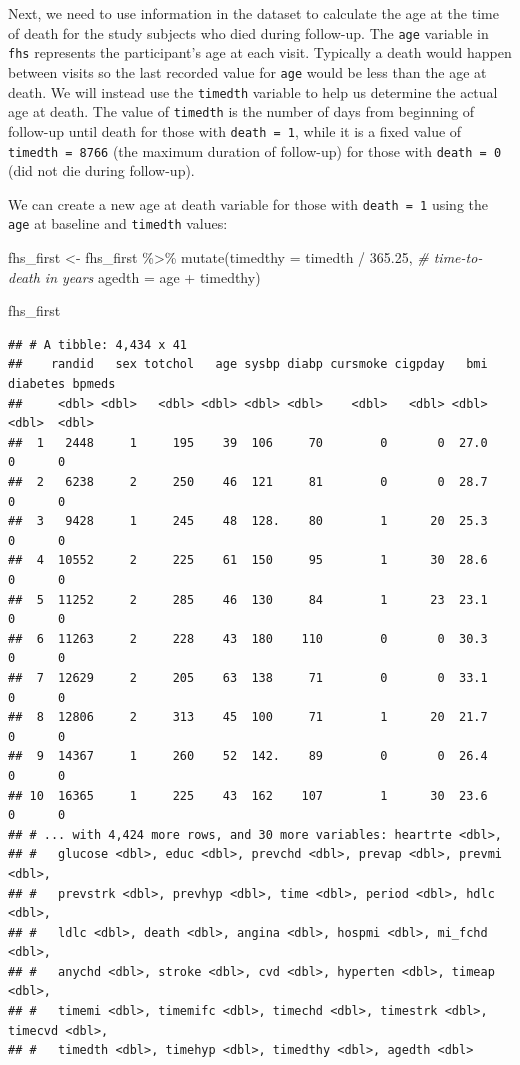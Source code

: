 \documentclass[
]{book}
\newenvironment{Shaded}{\begin{snugshade}}{\end{snugshade}}
\newcommand{\AttributeTok}[1]{\textcolor[rgb]{0.77,0.63,0.00}{#1}}
\newcommand{\CommentTok}[1]{\textcolor[rgb]{0.56,0.35,0.01}{\textit{#1}}}
\newcommand{\FloatTok}[1]{\textcolor[rgb]{0.00,0.00,0.81}{#1}}
\newcommand{\FunctionTok}[1]{\textcolor[rgb]{0.00,0.00,0.00}{#1}}
\newcommand{\NormalTok}[1]{#1}
\newcommand{\OtherTok}[1]{\textcolor[rgb]{0.56,0.35,0.01}{#1}}
\newcommand{\SpecialCharTok}[1]{\textcolor[rgb]{0.00,0.00,0.00}{#1}}
\begin{document}
Next, we need to use information in the dataset to calculate the age at the time of death for the study subjects who died during follow-up.
The \texttt{age} variable in \texttt{fhs} represents the participant's age at each visit. Typically a death would happen between visits so the last recorded value for \texttt{age} would be less than the age at death. We will instead use the \texttt{timedth} variable to help us determine the actual age at death. The value of \texttt{timedth} is the number of days from beginning of follow-up until death for those with \texttt{death\ =\ 1}, while it is a fixed value of \texttt{timedth\ =\ 8766} (the maximum duration of follow-up) for those with \texttt{death\ =\ 0} (did not die during follow-up).

We can create a new age at death variable for those with \texttt{death\ =\ 1} using the \texttt{age} at baseline and \texttt{timedth} values:

\begin{Shaded}
\begin{Highlighting}[]
\NormalTok{fhs\_first }\OtherTok{\textless{}{-}}\NormalTok{ fhs\_first }\SpecialCharTok{\%\textgreater{}\%} 
  \FunctionTok{mutate}\NormalTok{(}\AttributeTok{timedthy =}\NormalTok{ timedth }\SpecialCharTok{/} \FloatTok{365.25}\NormalTok{, }\CommentTok{\# time{-}to{-}death in years}
         \AttributeTok{agedth =}\NormalTok{ age }\SpecialCharTok{+}\NormalTok{ timedthy) }

\NormalTok{fhs\_first }
\end{Highlighting}
\end{Shaded}

\begin{verbatim}
## # A tibble: 4,434 x 41
##    randid   sex totchol   age sysbp diabp cursmoke cigpday   bmi diabetes bpmeds
##     <dbl> <dbl>   <dbl> <dbl> <dbl> <dbl>    <dbl>   <dbl> <dbl>    <dbl>  <dbl>
##  1   2448     1     195    39  106     70        0       0  27.0        0      0
##  2   6238     2     250    46  121     81        0       0  28.7        0      0
##  3   9428     1     245    48  128.    80        1      20  25.3        0      0
##  4  10552     2     225    61  150     95        1      30  28.6        0      0
##  5  11252     2     285    46  130     84        1      23  23.1        0      0
##  6  11263     2     228    43  180    110        0       0  30.3        0      0
##  7  12629     2     205    63  138     71        0       0  33.1        0      0
##  8  12806     2     313    45  100     71        1      20  21.7        0      0
##  9  14367     1     260    52  142.    89        0       0  26.4        0      0
## 10  16365     1     225    43  162    107        1      30  23.6        0      0
## # ... with 4,424 more rows, and 30 more variables: heartrte <dbl>,
## #   glucose <dbl>, educ <dbl>, prevchd <dbl>, prevap <dbl>, prevmi <dbl>,
## #   prevstrk <dbl>, prevhyp <dbl>, time <dbl>, period <dbl>, hdlc <dbl>,
## #   ldlc <dbl>, death <dbl>, angina <dbl>, hospmi <dbl>, mi_fchd <dbl>,
## #   anychd <dbl>, stroke <dbl>, cvd <dbl>, hyperten <dbl>, timeap <dbl>,
## #   timemi <dbl>, timemifc <dbl>, timechd <dbl>, timestrk <dbl>, timecvd <dbl>,
## #   timedth <dbl>, timehyp <dbl>, timedthy <dbl>, agedth <dbl>
\end{verbatim}
\end{document}
